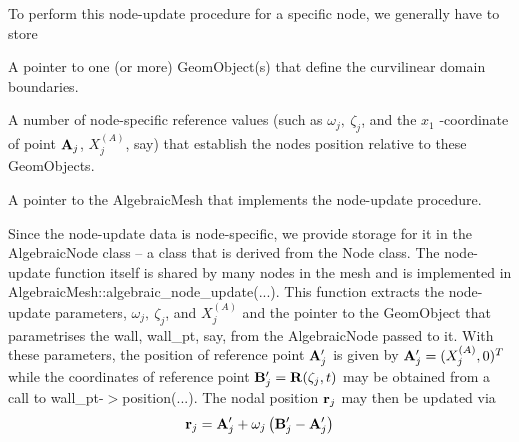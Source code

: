 To perform this node-\/update procedure for a specific node, we generally have to store
\begin{DoxyItemize}
\item A pointer to one (or more) {\ttfamily Geom\+Object(s)} that define the curvilinear domain boundaries. ~\newline
~\newline

\item A number of node-\/specific reference values (such as $ \omega_j, \ \zeta_j $, and the $ x_1 $ -\/coordinate of point $ {\bf A}_j $, $ X^{(A)}_j $, say) that establish the node\textquotesingle{}s position relative to these {\ttfamily Geom\+Objects}. ~\newline
~\newline

\item A pointer to the {\ttfamily Algebraic\+Mesh} that implements the node-\/update procedure.
\end{DoxyItemize}Since the node-\/update data is node-\/specific, we provide storage for it in the {\ttfamily Algebraic\+Node} class -- a class that is derived from the {\ttfamily Node} class. The node-\/update function itself is shared by many nodes in the mesh and is implemented in {\ttfamily Algebraic\+Mesh\+::algebraic\+\_\+node\+\_\+update}(...). This function extracts the node-\/update parameters, $ \omega_j, \ \zeta_j $, and $ X^{(A)}_j $ and the pointer to the {\ttfamily Geom\+Object} that parametrises the wall, {\ttfamily wall\+\_\+pt}, say, from the {\ttfamily Algebraic\+Node} passed to it. With these parameters, the position of reference point ${\bf A}'_j $ is given by $ {\bf A}'_j = (X_j^{(A)},0)^T $ while the coordinates of reference point $ {\bf B}'_j = {\bf R}(\zeta_j,t)$ may be obtained from a call to {\ttfamily wall\+\_\+pt-\/$>$position}(...). The nodal position $ {\bf r}_j $ may then be updated via \[ {\bf r}_j = {\bf A}_j' + \omega_j \left( {\bf B}_j'-{\bf A}_j' \right) \]



 

